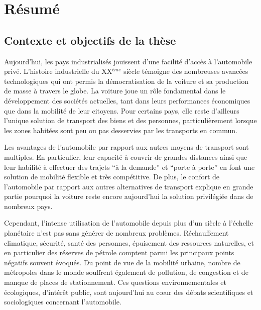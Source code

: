 \newpage
\chapter*{Résumé}
\section*{Contexte et objectifs de la thèse}

Aujourd'hui, les pays industrialisés jouissent d'une facilité d'accès à l'automobile privé.
L'histoire industrielle du XX$^{ème}$ siècle témoigne des nombreuses avancées technologiques qui ont permis la démocratisation de la voiture et sa production de masse à travers le globe.
La voiture joue un rôle fondamental dans le développement des sociétés actuelles, tant dans leurs performances économiques que dans la mobilité de leur citoyens.
Pour certains pays, elle reste d'ailleurs l'unique solution de transport des biens et des personnes, particulièrement lorsque les zones habitées sont peu ou pas desservies par les transports en commun.

\medskip
Les avantages de l'automobile par rapport aux autres moyens de transport sont multiples.
En particulier, leur capacité à couvrir de grandes distances ainsi que leur habilité à effectuer des trajets ``à la demande'' et ``porte à porte'' en font une solution de mobilité flexible et très compétitive.
De plus, le confort de l'automobile par rapport aux autres alternatives de transport explique en grande partie pourquoi la voiture reste encore aujourd'hui la solution  privilégiée dans de nombreux pays.

\medskip
Cependant, l'intense utilisation de l'automobile depuis plus d'un siècle à l'échelle planétaire n'est pas sans générer de nombreux problèmes.
Réchauffement climatique, sécurité, santé des personnes, épuisement des ressources naturelles, et en particulier des réserves de pétrole comptent parmi les principaux points négatifs souvent évoqués.
Du point de vue de la mobilité urbaine, nombre de métropoles dans le monde souffrent également de pollution, de congestion et de manque de places de stationnement.
Ces questions environnementales et écologiques, d'intérêt public, sont aujourd'hui au cœur des débats scientifiques et sociologiques concernant l'automobile.

